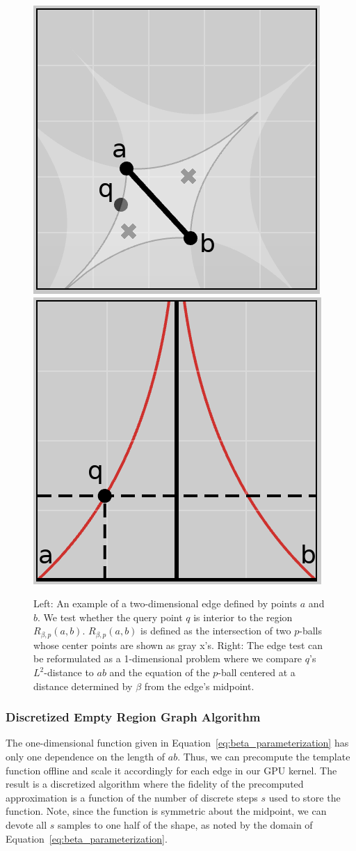 \begin{figure}[b]
    \includegraphics[width=0.48\linewidth]{figs/chap7/bskeleton.png}
    \includegraphics[width=0.48\linewidth]{figs/chap7/bskeletonParameter.png}
    \caption[Illustration of the one-dimensional edge test]{Left: An example of a two-dimensional edge defined by points $a$ and $b$.
    We test whether the query point $q$ is interior to the region $R_{\beta,p}(a,b)$.
    $R_{\beta,p}(a,b)$ is defined as the intersection of two $p$-balls whose center points are shown as gray x's.
    Right: The edge test can be reformulated as a 1-dimensional problem where we compare $q$'s $L^2$-distance to $ab$ and the equation of the $p$-ball centered at a distance determined by $\beta$ from the edge's midpoint.}
    \label{fig:beta_p_example}
\end{figure}

\subsubsection{Discretized Empty Region Graph Algorithm}
\label{sec:gpu_bp_discrete}

The one-dimensional function given in Equation~\ref{eq:beta_parameterization} has only one dependence on the length of $ab$.
%
Thus, we can precompute the template function offline and scale it accordingly for each edge in our GPU kernel.
%
The result is a discretized algorithm where the fidelity of the precomputed approximation is a function of the number of discrete steps $s$ used to store the function.
%
Note, since the function is symmetric about the midpoint, we can devote all $s$ samples to one half of the shape, as noted by the domain of Equation~\ref{eq:beta_parameterization}.

